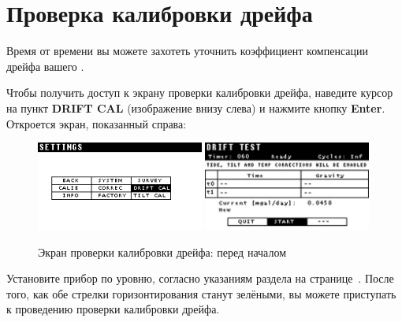 \section{Проверка калибровки дрейфа}

Время от времени вы можете захотеть уточнить коэффициент компенсации дрейфа
вашего \cg{}.


Чтобы получить доступ к экрану проверки калибровки дрейфа, наведите курсор на
пункт \textbf{DRIFT CAL} (изображение внизу слева) и нажмите кнопку
\textbf{Enter}. Откроется экран, показанный справа:

\begin{figure}[H]
  \centering
  \includegraphics[width=0.49\textwidth]{figures/the_drift_calibration_test_screen_befor_started_1}
  \includegraphics[width=0.49\textwidth]{figures/the_drift_calibration_test_screen_befor_started_2}
  \caption{Экран проверки калибровки дрейфа: перед началом}
  \label{fig:the_drift_calibration_test_screen_befor_started}
\end{figure}

Установите прибор \cg{} по уровню, согласно указаниям раздела
 на
странице~\pageref{subsec:leveling_the_cg6_autograv}. После того, как обе стрелки
горизонтирования станут зелёными, вы можете приступать к проведению проверки
калибровки дрейфа.

